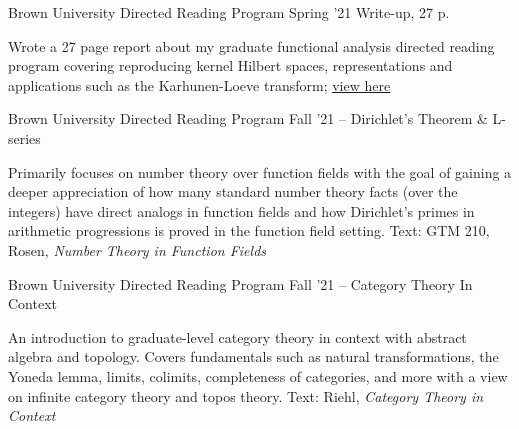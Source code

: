 
\begin{cventries}
    \cventry 
        {}
        {Brown University Directed Reading Program Spring '21 Write-up, 27 p.}
        {}
        {}
        { 
            \begin{cvitems}
              \item {Wrote a 27 page report about my graduate functional analysis directed reading program covering reproducing kernel Hilbert spaces, representations and applications such as the Karhunen-Loeve transform}; \href{https://github.com/alizma/Spring2021_Functional_Analysis_Paper}{\underline{view here}}
            \end{cvitems}
        }
        
    \cventry 
        {}
        {Brown University Directed Reading Program Fall '21 -- Dirichlet’s Theorem \& L-series}
        {}
        {}
        { 
            \begin{cvitems}
              \item {Primarily focuses on number theory over function fields with the goal of gaining a deeper appreciation of how many standard number theory facts (over the integers) have direct analogs in function fields and how Dirichlet’s primes in arithmetic progressions is proved in the function field setting. Text: GTM 210, Rosen, \textit{Number Theory in Function Fields}}
            \end{cvitems}
        }
        
            \cventry 
        {}
        {Brown University Directed Reading Program Fall '21 -- Category Theory In Context}
        {}
        {}
        { 
            \begin{cvitems}
              \item {An introduction to graduate-level category theory in context with abstract algebra and topology. Covers fundamentals such as natural transformations, the Yoneda lemma, limits, colimits, completeness of categories, and more with a view on infinite category theory and topos theory. Text: Riehl, \textit{Category Theory in Context}}
            \end{cvitems}
        }
        



\end{cventries}